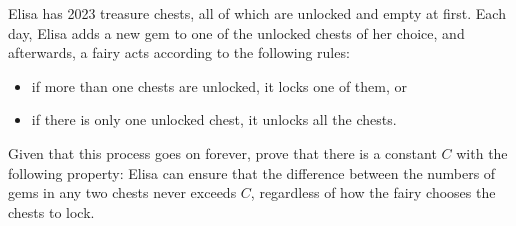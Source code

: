 Elisa has 2023 treasure chests, all of which are unlocked and empty at first. Each day, Elisa adds a new gem to one of the unlocked chests of her choice, and afterwards, a fairy acts according to the following rules:
\begin{itemize}
\item if more than one chests are unlocked, it locks one of them, or
\item if there is only one unlocked chest, it unlocks all the chests.
\end{itemize}
Given that this process goes on forever, prove that there is a constant $C$ with the following property: Elisa can ensure that the difference between the numbers of gems in any two chests never exceeds $C$, regardless of how the fairy chooses the chests to lock.
